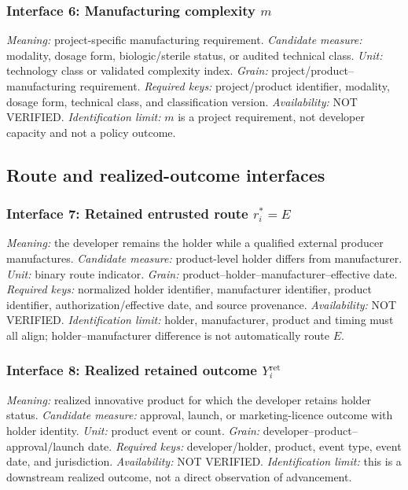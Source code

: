 \subsubsection{Interface 6: Manufacturing complexity \texorpdfstring{\(m\)}{complexity index}}
\textit{Meaning:} project-specific manufacturing requirement.
\textit{Candidate measure:} modality, dosage form, biologic/sterile status, or
audited technical class.
\textit{Unit:} technology class or validated complexity index.
\textit{Grain:} project/product--manufacturing requirement.
\textit{Required keys:} project/product identifier, modality, dosage form,
technical class, and classification version.
\textit{Availability:} NOT VERIFIED.
\textit{Identification limit:} \(m\) is a project requirement, not developer
capacity and not a policy outcome.

\subsection{Route and realized-outcome interfaces}
\label{subsec:p10-routes-outcomes}

\subsubsection{Interface 7: Retained entrusted route \texorpdfstring{\(r_i^*=E\)}{retained route E}}
\textit{Meaning:} the developer remains the holder while a qualified external
producer manufactures.
\textit{Candidate measure:} product-level holder differs from manufacturer.
\textit{Unit:} binary route indicator.
\textit{Grain:} product--holder--manufacturer--effective date.
\textit{Required keys:} normalized holder identifier, manufacturer identifier,
product identifier, authorization/effective date, and source provenance.
\textit{Availability:} NOT VERIFIED.
\textit{Identification limit:} holder, manufacturer, product and timing must
all align; holder--manufacturer difference is not automatically route \(E\).

\subsubsection{Interface 8: Realized retained outcome \texorpdfstring{\(Y_i^{\mathrm{ret}}\)}{retained outcome}}
\textit{Meaning:} realized innovative product for which the developer retains
holder status.
\textit{Candidate measure:} approval, launch, or marketing-licence outcome
with holder identity.
\textit{Unit:} product event or count.
\textit{Grain:} developer--product--approval/launch date.
\textit{Required keys:} developer/holder, product, event type, event date, and
jurisdiction.
\textit{Availability:} NOT VERIFIED.
\textit{Identification limit:} this is a downstream realized outcome, not a
direct observation of advancement.


